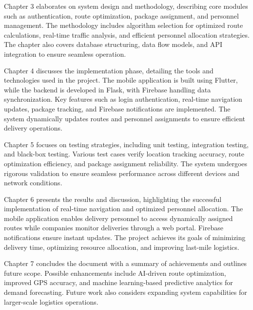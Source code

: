 Chapter 3 elaborates on system design and methodology, describing core modules such as authentication, route optimization, package assignment, and personnel management. The methodology includes algorithm selection for optimized route calculations, real-time traffic analysis, and efficient personnel allocation strategies. The chapter also covers database structuring, data flow models, and API integration to ensure seamless operation.

Chapter 4 discusses the implementation phase, detailing the tools and technologies used in the project. The mobile application is built using Flutter, while the backend is developed in Flask, with Firebase handling data synchronization. Key features such as login authentication, real-time navigation updates, package tracking, and Firebase notifications are implemented. The system dynamically updates routes and personnel assignments to ensure efficient delivery operations.

Chapter 5 focuses on testing strategies, including unit testing, integration testing, and black-box testing. Various test cases verify location tracking accuracy, route optimization efficiency, and package assignment reliability. The system undergoes rigorous validation to ensure seamless performance across different devices and network conditions.

Chapter 6 presents the results and discussion, highlighting the successful implementation of real-time navigation and optimized personnel allocation. The mobile application enables delivery personnel to access dynamically assigned routes while companies monitor deliveries through a web portal. Firebase notifications ensure instant updates. The project achieves its goals of minimizing delivery time, optimizing resource allocation, and improving last-mile logistics.

Chapter 7 concludes the document with a summary of achievements and outlines future scope. Possible enhancements include AI-driven route optimization, improved GPS accuracy, and machine learning-based predictive analytics for demand forecasting. Future work also considers expanding system capabilities for larger-scale logistics operations.